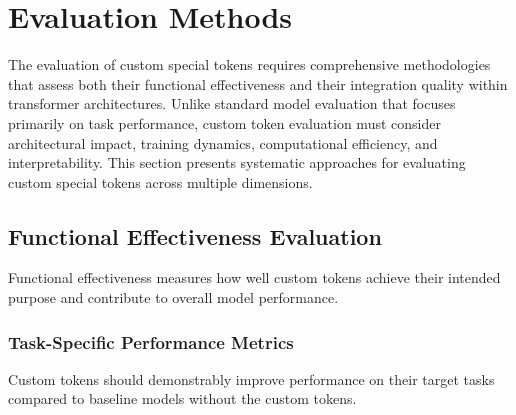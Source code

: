 
\section{Evaluation Methods}

The evaluation of custom special tokens requires comprehensive methodologies that assess both their functional effectiveness and their integration quality within transformer architectures. Unlike standard model evaluation that focuses primarily on task performance, custom token evaluation must consider architectural impact, training dynamics, computational efficiency, and interpretability. This section presents systematic approaches for evaluating custom special tokens across multiple dimensions.

\subsection{Functional Effectiveness Evaluation}

Functional effectiveness measures how well custom tokens achieve their intended purpose and contribute to overall model performance.

\subsubsection{Task-Specific Performance Metrics}

Custom tokens should demonstrably improve performance on their target tasks compared to baseline models without the custom tokens.

